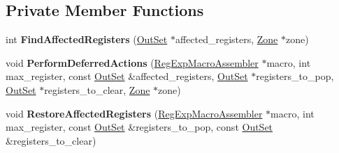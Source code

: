 \subsection*{Private Member Functions}
\begin{DoxyCompactItemize}
\item 
int {\bfseries Find\+Affected\+Registers} (\hyperlink{classv8_1_1internal_1_1_out_set}{Out\+Set} $\ast$affected\+\_\+registers, \hyperlink{classv8_1_1internal_1_1_zone}{Zone} $\ast$zone)\hypertarget{classv8_1_1internal_1_1_trace_a36aeb1febd6c43afa7ba6a850cd7629b}{}\label{classv8_1_1internal_1_1_trace_a36aeb1febd6c43afa7ba6a850cd7629b}

\item 
void {\bfseries Perform\+Deferred\+Actions} (\hyperlink{classv8_1_1internal_1_1_reg_exp_macro_assembler}{Reg\+Exp\+Macro\+Assembler} $\ast$macro, int max\+\_\+register, const \hyperlink{classv8_1_1internal_1_1_out_set}{Out\+Set} \&affected\+\_\+registers, \hyperlink{classv8_1_1internal_1_1_out_set}{Out\+Set} $\ast$registers\+\_\+to\+\_\+pop, \hyperlink{classv8_1_1internal_1_1_out_set}{Out\+Set} $\ast$registers\+\_\+to\+\_\+clear, \hyperlink{classv8_1_1internal_1_1_zone}{Zone} $\ast$zone)\hypertarget{classv8_1_1internal_1_1_trace_aa4d0bd0ef8106f9c272ac13c82bdbb44}{}\label{classv8_1_1internal_1_1_trace_aa4d0bd0ef8106f9c272ac13c82bdbb44}

\item 
void {\bfseries Restore\+Affected\+Registers} (\hyperlink{classv8_1_1internal_1_1_reg_exp_macro_assembler}{Reg\+Exp\+Macro\+Assembler} $\ast$macro, int max\+\_\+register, const \hyperlink{classv8_1_1internal_1_1_out_set}{Out\+Set} \&registers\+\_\+to\+\_\+pop, const \hyperlink{classv8_1_1internal_1_1_out_set}{Out\+Set} \&registers\+\_\+to\+\_\+clear)\hypertarget{classv8_1_1internal_1_1_trace_a72e0d0bc80964eac8988f46a579e6a44}{}\label{classv8_1_1internal_1_1_trace_a72e0d0bc80964eac8988f46a579e6a44}

\end{DoxyCompactItemize}
